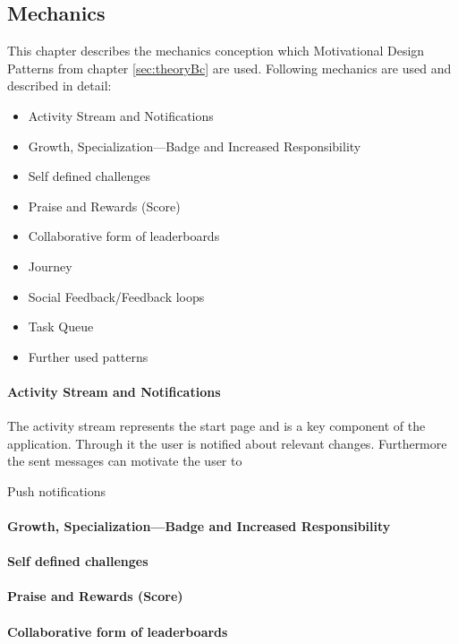 \subsection{Mechanics}
\label{sec:domainCc}

This chapter describes the mechanics conception which Motivational Design Patterns from chapter \ref{sec:theoryBc} are used.
Following mechanics are used and described in detail:
\begin{itemize}
	\item Activity Stream and Notifications
	\item Growth, Specialization—Badge and Increased Responsibility
	\item Self defined challenges
	\item Praise and Rewards (Score)
	\item Collaborative form of leaderboards
	\item Journey
	\item Social Feedback/Feedback loops
	\item Task Queue
	\item Further used patterns
\end{itemize}

\paragraph*{Activity Stream and Notifications}
The activity stream represents the start page and is a key component of the application. Through it the user is notified about relevant changes. Furthermore the sent messages can motivate the user to 

Push notifications

\paragraph*{Growth, Specialization—Badge and Increased Responsibility}

\paragraph*{Self defined challenges}

\paragraph*{Praise and Rewards (Score)}

\paragraph*{Collaborative form of leaderboards}

